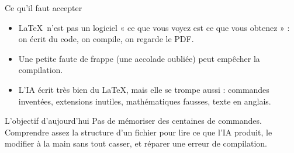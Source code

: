 \begin{frame}{Ce qu'il faut accepter}
  \small
  \begin{itemize}
    \item \LaTeX\ n'est pas un logiciel « ce que vous voyez est ce que vous
      obtenez » : on écrit du code, on compile, on regarde le PDF.
    \item Une petite faute de frappe (une accolade oubliée) peut empêcher
      la compilation.
    \item L'IA écrit très bien du \LaTeX, mais elle se trompe aussi :
      commandes inventées, extensions inutiles, mathématiques fausses,
      texte en anglais.
  \end{itemize}
  \vspace{4pt}
  \begin{Rem}{L'objectif d'aujourd'hui}
    Pas de mémoriser des centaines de commandes. Comprendre assez la
    structure d'un fichier pour lire ce que l'IA produit, le modifier à la
    main sans tout casser, et réparer une erreur de compilation.
  \end{Rem}
\end{frame}
